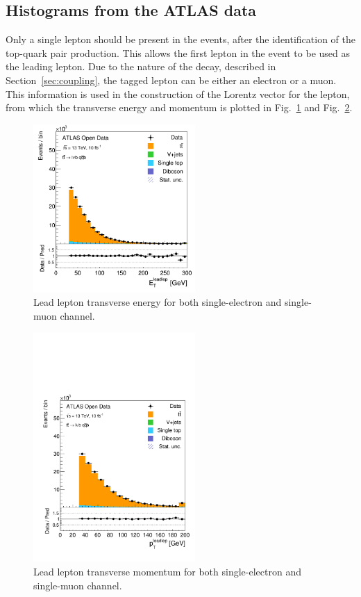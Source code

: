 \documentclass[12pt,a4paper]{article}
\numberwithin{equation}{section}
\begin{document}
\subsection{Histograms from the ATLAS data}
Only a single lepton should be present in the events, after the identification
of the top-quark pair production. This allows the first lepton in the event to
be used as the leading lepton. Due to the nature of the decay, described in
Section~\ref{sec:coupling}, the tagged lepton can be either an electron or a
muon. This information is used in the construction of the Lorentz vector for the
lepton, from which the transverse energy and momentum is plotted in
Fig.~\ref{fig:lepEt} and Fig.~\ref{fig:leppt}.
\begin{figure}[H]
  \centering
  \includegraphics[width=0.55\textwidth]{figures/hist_leadleptEt}
  \caption{\label{fig:lepEt}Lead lepton transverse energy for both single-electron and single-muon channel.}
\end{figure}
\begin{figure}[H]
  \centering
  \includegraphics[width=0.55\textwidth]{figures/hist_leadleptpt}
  \caption{\label{fig:leppt}Lead lepton transverse momentum for both single-electron and single-muon channel.}
\end{figure}
\end{document}
